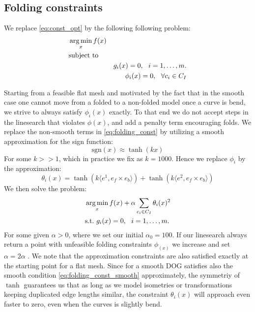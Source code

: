 \subsection{Folding constraints}

 We replace \eqref{eq:const_opt} by the following following problem:
\begin{equation} \label{eq:const_opt}
\begin{aligned}
& \operatorname*{arg\,min}_x
f(x) \\
& \textrm{subject to} \\
& & g_i(x) = 0, \ \  i = 1, \ldots, m. \\
& & \phi_i(x) = 0, \ \  \forall c_i \in C_{I}
\end{aligned}
\end{equation}

Starting from a feasible flat mesh and motivated by the fact that in the smooth case one cannot move from a folded to a non-folded model once a curve is bend, we strive to always satisfy $\phi_i(x)$ exactly. To that end we do not accept steps in the linesearch that violates $\phi(x)$, and add a penalty term encouraging folds. We replace the non-smooth terms in \eqref{eq:folding_const} by utilizing a smooth approximation for the sign function:
\begin{equation} \label{eq:sign_smooth_approx}
\text{sgn}(x) \approx \tanh(kx)
\end{equation}
For some $k >> 1$, which in practice we fix as $k = 1000$. Hence we replace $\phi_i$ by the approximation:
\begin{equation} \label{eq:folding_const_smooth}
\theta_i(x) = \tanh(k\langle e^1,e_f \times e_b \rangle) +  \tanh(k\langle e^2,e_f \times e_b\rangle)
\end{equation}
We then solve the problem:
\begin{equation} \label{eq:const_opt}
\begin{aligned}
& \operatorname*{arg\,min}_x
f(x) + \alpha \sum_{c_i \in C_{I}} \theta_i(x)^2\\
& \textrm{s.t.}
\text{ } g_i(x) = 0, \ \  i = 1, \ldots, m.
\end{aligned}
\end{equation}
For some given $\alpha > 0$, where we set our initial $\alpha_0 = 100$. If our linesearch always return a point with unfeasible folding constraints $\phi_(x)$ we increase and set $\alpha = 2\alpha$ .
We note that the approximation constraints are also satisfied exactly at the starting point for a flat mesh. Since for a smooth DOG satisfies also the smooth condition \eqref{eq:folding_const_smooth} approximately, the symmetriy of $\tanh$ guarantees us that as long as we model isometries or transformations keeping duplicated edge lengths similar, the constraint $\theta_i(x)$ will approach even faster to zero, even when the curves is slightly bend.

